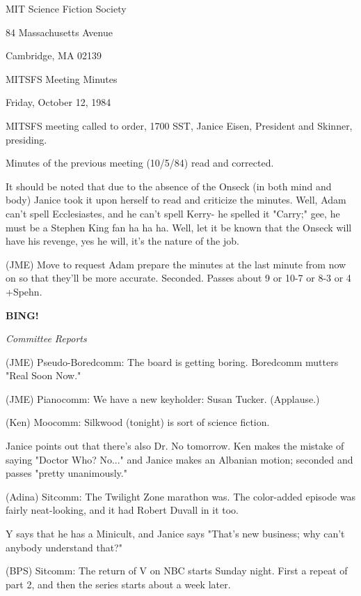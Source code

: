 \documentclass[12pt]{article}
\newcommand{\bing}{{\bf BING!} }
\newcommand{\goto}[1]{\bing \vskip 12pt \centerline{{\em{#1}}}}
\begin{document}
\begin{center}

MIT Science Fiction Society 

84 Massachusetts Avenue

Cambridge, MA 02139

\vspace{12pt}

MITSFS Meeting Minutes 

Friday, October 12, 1984

\end{center}
 
\vspace{18pt}

\setlength{\parskip}{6pt}

\noindent
MITSFS meeting called to order, 1700 SST,
Janice Eisen, President and Skinner, presiding.

Minutes of the previous meeting (10/5/84) read and corrected.

It should be noted that due to the absence of the Onseck (in both mind and body) Janice took it upon herself to read and criticize the minutes. Well, Adam can't spell Ecclesiastes, and he can't spell Kerry- he spelled it "Carry;" gee, he must be a Stephen King fan ha ha ha. Well, let it be known that the Onseck will have his revenge, yes he will, it's the nature of the job.

(JME) Move to request Adam prepare the minutes at the last minute from now on so that they'll be more accurate. Seconded. Passes about 9 or 10-7 or 8-3 or 4 +Spehn.

\goto{Committee Reports}

(JME) Pseudo-Boredcomm: The board is getting boring. Boredcomm mutters "Real Soon Now."

(JME) Pianocomm: We have a new keyholder: Susan Tucker. (Applause.)

(Ken) Moocomm: Silkwood (tonight) is sort of science fiction.

Janice points out that there's also Dr. No tomorrow. Ken makes the mistake of saying "Doctor Who? No..." and Janice makes an Albanian motion; seconded and passes "pretty unanimously."

(Adina) Sitcomm: The Twilight Zone marathon was. The color-added episode was fairly neat-looking, and it had Robert Duvall in it too.

Y says that he has a Minicult, and Janice says "That's new business; why can't anybody understand that?"

(BPS) Sitcomm: The return of V on NBC starts Sunday night. First a repeat of part 2, and then the series starts about a week later.
\end{document}
